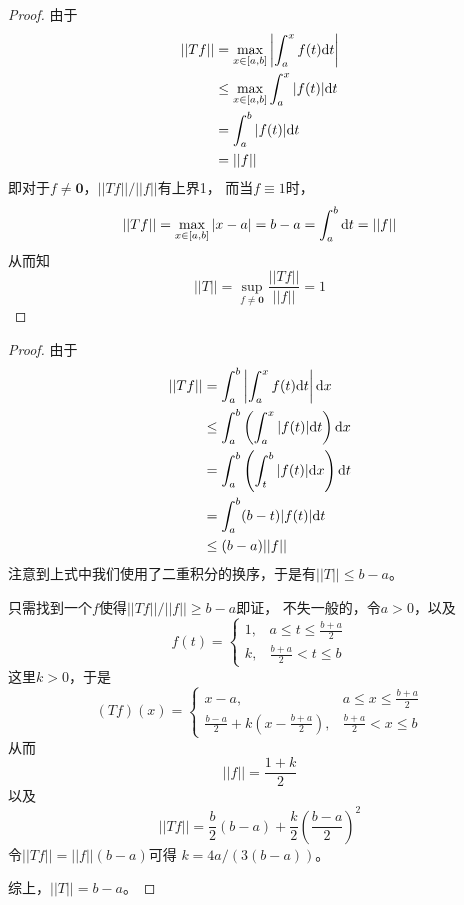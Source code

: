 \documentclass[cn]{homework}
\begin{document}
    \problem
    \begin{subproblem}[(\arabic*)]
        \item
        \begin{proof}
        由于
        \[\begin{aligned}
            ||Tf||&=\max_{x\in[a,b]}\left|\int_a^xf(t)\mathrm d t\right|\\
            &\leq\max_{x\in[a,b]}\int_a^x|f(t)|\mathrm d t\\
            &=\int_a^b|f(t)|\mathrm d t\\
            &=||f||
        \end{aligned}\]
        即对于$f\neq\boldsymbol 0$，$||Tf||/||f||$有上界1，
        而当$f\equiv 1$时，
        \[||Tf||=\max_{x\in[a,b]}|x-a|=b-a=\int_a^b\mathrm d t=||f||\]
        从而知
        \[||T||=\sup_{f\neq\boldsymbol 0}\frac{||Tf||}{||f||}=1\]
        \end{proof}

        \item
        \begin{proof}
        由于
        \[\begin{aligned}
            ||Tf||&=\int_a^b\left|\int_a^xf(t)\mathrm d t\right|\mathrm d x\\
            &\leq\int_a^b\left(\int_a^x|f(t)|\mathrm d t\right)\mathrm d x\\
            &=\int_a^b\left(\int_t^b|f(t)|\mathrm d x\right)\mathrm d t\\
            &=\int_a^b(b-t)|f(t)|\mathrm d t\\
            &\leq(b-a)||f||
        \end{aligned}\]
        注意到上式中我们使用了二重积分的换序，于是有$||T||\leq b-a$。

        只需找到一个$f$使得$||Tf||/||f||\geq b-a$即证，
        不失一般的，令$a>0$，以及
        \[f(t)=\begin{cases}
            1,&a\leq t\leq\frac{b+a}{2}\\
            k,&\frac{b+a}{2}<t\leq b
        \end{cases}\]
        这里$k>0$，于是
        \[(Tf)(x)=\begin{cases}
            x-a,&a\leq x\leq\frac{b+a}{2}\\
            \frac{b-a}{2}+k\left(x-\frac{b+a}{2}\right),
            &\frac{b+a}{2}<x\leq b
        \end{cases}\]
        从而
        \[||f||=\frac{1+k}{2}\]
        以及
        \[||Tf||=\frac{b}{2}(b-a)+\frac{k}{2}\left(\frac{b-a}{2}\right)^2\]
        令$||Tf||=||f||(b-a)$可得
        $k=4a/(3(b-a))$。
        
        综上，$||T||=b-a$。
        \end{proof}
    \end{subproblem}
\end{document}
